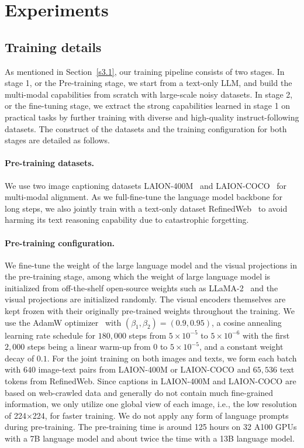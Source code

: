 \documentclass{article} \usepackage{iclr2024_conference,times}
\begin{document}
\section{Experiments}


\subsection{Training details}

As mentioned in Section~\ref{s3.1}, our training pipeline consists of two stages. In stage 1, or the Pre-training stage, we start from a text-only LLM, and build the multi-modal capabilities from scratch with large-scale noisy datasets. In stage 2, or the fine-tuning stage, we extract the strong capabilities learned in stage 1 on practical tasks by further training with diverse and high-quality instruct-following datasets. The construct of the datasets and the training configuration for both stages are detailed as follows.

\paragraph{Pre-training datasets.} We use two image captioning datasets LAION-400M~\citep{schuhmann2021laion} and LAION-COCO~\citep{laioncoco} for multi-modal alignment. As we full-fine-tune the language model backbone for long steps, we also jointly train with a text-only dataset RefinedWeb~\citep{Penedo2023TheRD} to avoid harming its text reasoning capability due to catastrophic forgetting.

\paragraph{Pre-training configuration.} We fine-tune the weight of the large language model and the visual projections in the pre-training stage, among which the weight of large language model is initialized from off-the-shelf open-source weights such as LLaMA-2~\citep{Touvron2023Llama2O} and the visual projections are initialized randomly. The visual encoders themselves are kept frozen with their originally pre-trained weights throughout the training. We use the AdamW optimizer~\citep{Kingma2014AdamAM} with $\left( \beta_1, \beta_2 \right) = (0.9, 0.95)$, a cosine annealing learning rate schedule for $180,000$ steps from $5 \times 10^{-5}$ to $5 \times 10^{-6}$ with the first $2,000$ steps being a linear warm-up from $0$ to $5 \times 10^{-5}$, and a constant weight decay of $0.1$. For the joint training on both images and texts, we form each batch with $640$ image-text pairs from LAION-400M or LAION-COCO and $65,536$ text tokens from RefinedWeb. Since captions in LAION-400M and LAION-COCO are based on web-crawled data and generally do not contain much fine-grained information, we only utilize one global view of each image, i.e., the low resolution of 224$\times$224, for faster training. We do not apply any form of language prompts during pre-training. The pre-training time is around 125 hours on 32 A100 GPUs with a 7B language model and about twice the time with a 13B language model.
\end{document}
